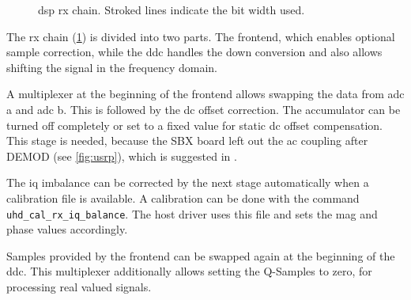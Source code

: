 \documentclass[12pt,a4paper,parskip=full]{scrartcl}
\begin{document}
\begin{figure}[htb]
{}
\caption{\gls{dsp} \gls{rx} chain. Stroked lines indicate the bit width used.}
    \label{fig:rxpath}
\end{figure}
The \gls{rx} chain (\cref{fig:rxpath}) is divided into two parts. The frontend, 
which enables optional sample correction, while the \gls{ddc} handles the down
conversion and also allows shifting the signal in the frequency domain.

A multiplexer at the beginning of the frontend allows swapping the data from
\gls{adc} a and \gls{adc} b. This is followed by the \gls{dc} offset correction.
The accumulator can be turned off completely or set to a fixed value for static
\gls{dc} offset compensation. This stage is needed, because the SBX board left
out the \gls{ac} coupling after DEMOD (see \cref{fig:usrp}), which is suggested
in \cite{demod}.

The \gls{iq} imbalance can be corrected by the next stage automatically
when a calibration file is available. A calibration can be done with the command
\verb+uhd_cal_rx_iq_balance+\cite{usrp_cal}. The host driver uses this
file and sets the mag and phase values accordingly.

Samples provided by the frontend can be swapped again at the beginning of the
\gls{ddc}. This multiplexer additionally allows setting the Q-Samples to zero,
for processing real valued signals.
\end{document}
